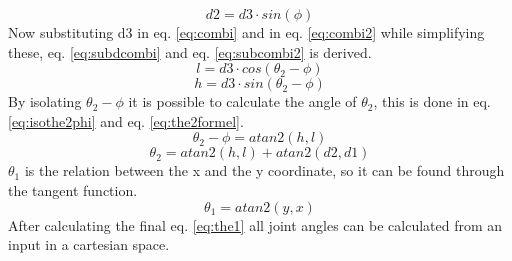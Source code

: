 \begin{equation}\label{eq:subd2}
    d2=d3 \cdot sin(\phi)
\end{equation}
Now substituting d3 in eq. \ref{eq:combi} and in eq. \ref{eq:combi2} while simplifying these, eq. \ref{eq:subdcombi} and eq. \ref{eq:subcombi2} is derived.
\begin{equation}\label{eq:subdcombi}
    l=d3 \cdot cos(\theta_2-\phi)
\end{equation}
\begin{equation}\label{eq:subcombi2}
    h=d3 \cdot sin(\theta_2-\phi)
\end{equation}
By isolating $\theta_2-\phi$ it is possible to calculate the angle of $\theta_2$, this is done in eq. \ref{eq:isothe2phi} and eq. \ref{eq:the2formel}.
\begin{equation}\label{eq:isothe2phi}
    \theta_2-\phi= atan2(h,l)
\end{equation}
\begin{equation}\label{eq:the2formel}
    \theta_2 = atan2(h,l) +atan2(d2,d1)
\end{equation}
$\theta_1$ is the relation between the x and the y coordinate, so it can be found through the tangent function.
\begin{equation}\label{eq:the1}
   \theta_1= atan2(y,x) 
\end{equation}
After calculating the final eq. \ref{eq:the1} all joint angles can be calculated from an input in a cartesian space.
